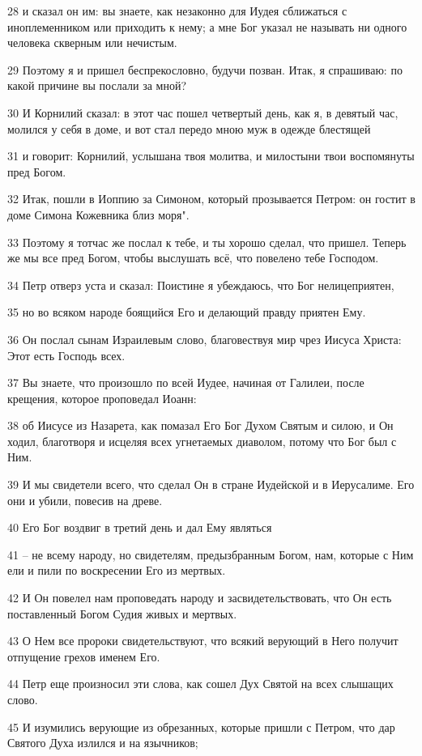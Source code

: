28 и сказал он им: вы знаете, как незаконно для Иудея сближаться с иноплеменником или приходить к нему; а мне Бог указал не называть ни одного человека скверным или нечистым.

29 Поэтому я и пришел беспрекословно, будучи позван. Итак, я спрашиваю: по какой причине вы послали за мной?

30 И Корнилий сказал: в этот час пошел четвертый день, как я, в девятый час, молился у себя в доме, и вот стал передо мною муж в одежде блестящей

31 и говорит: Корнилий, услышана твоя молитва, и милостыни твои воспомянуты пред Богом.

32 Итак, пошли в Иоппию за Симоном, который прозывается Петром: он гостит в доме Симона Кожевника близ моря".

33 Поэтому я тотчас же послал к тебе, и ты хорошо сделал, что пришел. Теперь же мы все пред Богом, чтобы выслушать всё, что повелено тебе Господом.

34 Петр отверз уста и сказал: Поистине я убеждаюсь, что Бог нелицеприятен,

35 но во всяком народе боящийся Его и делающий правду приятен Ему.

36 Он послал сынам Израилевым слово, благовествуя мир чрез Иисуса Христа: Этот есть Господь всех.

37 Вы знаете, что произошло по всей Иудее, начиная от Галилеи, после крещения, которое проповедал Иоанн:

38 об Иисусе из Назарета, как помазал Его Бог Духом Святым и силою, и Он ходил, благотворя и исцеляя всех угнетаемых диаволом, потому что Бог был с Ним.

39 И мы свидетели всего, что сделал Он в стране Иудейской и в Иерусалиме. Его они и убили, повесив на древе.

40 Его Бог воздвиг в третий день и дал Ему являться

41 – не всему народу, но свидетелям, предызбранным Богом, нам, которые с Ним ели и пили по воскресении Его из мертвых.

42 И Он повелел нам проповедать народу и засвидетельствовать, что Он есть поставленный Богом Судия живых и мертвых.

43 О Нем все пророки свидетельствуют, что всякий верующий в Него получит отпущение грехов именем Его.

44 Петр еще произносил эти слова, как сошел Дух Святой на всех слышащих слово.

45 И изумились верующие из обрезанных, которые пришли с Петром, что дар Святого Духа излился и на язычников;


